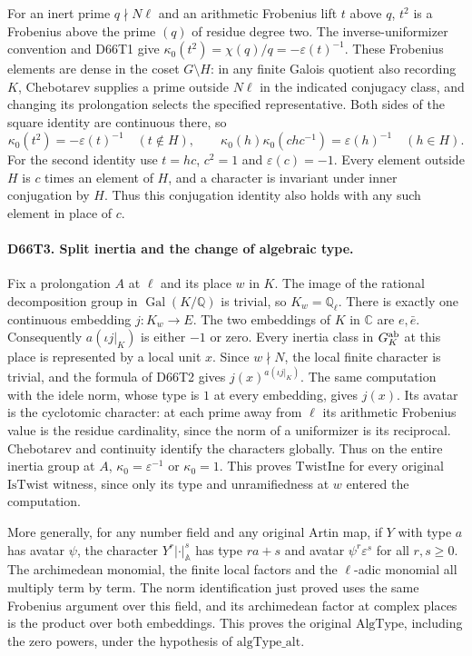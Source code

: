 For an inert prime $q\nmid N\ell$ and an arithmetic Frobenius lift
$t$ above $q$, $t^2$ is a Frobenius above the prime $(q)$ of residue
degree two. The inverse-uniformizer convention and D66T1 give
$\kappa_0(t^2)=\chi(q)/q=-\varepsilon(t)^{-1}$. These Frobenius
elements are dense in the coset $G\setminus H$: in any finite Galois
quotient also recording $K$, Chebotarev supplies a prime outside
$N\ell$ in the indicated conjugacy class, and changing its prolongation
selects the specified representative. Both sides of the square
identity are continuous there, so
\[
 \kappa_0(t^2)=-\varepsilon(t)^{-1}\quad(t\notin H),\qquad
 \kappa_0(h)\kappa_0(chc^{-1})=\varepsilon(h)^{-1}\quad(h\in H).
\]
For the second identity use $t=hc$, $c^2=1$ and
$\varepsilon(c)=-1$. Every element outside $H$ is $c$ times an
element of $H$, and a character is invariant under inner conjugation
by $H$. Thus this conjugation identity also holds with any such
element in place of $c$.

\paragraph{D66T3. Split inertia and the change of algebraic type.}
Fix a prolongation $A$ at $\ell$ and its place $w$ in $K$.
The image of the rational decomposition group in
$\operatorname{Gal}(K/\mathbb Q)$ is trivial, so $K_w=\mathbb Q_\ell$.
There is exactly one continuous embedding $j:K_w\to E$.
The two embeddings of $K$ in $\mathbb C$ are $e,\bar e$.
Consequently $a(\iota j|_K)$ is either $-1$ or zero. Every inertia
class in $G_K^{\rm ab}$ at this place is represented by a local unit
$x$. Since $w\nmid N$, the local finite character is trivial,
and the formula of D66T2 gives $j(x)^{a(\iota j|_K)}$.
The same computation with the idele norm, whose type is $1$ at
every embedding, gives $j(x)$. Its avatar is the cyclotomic
character: at each prime away from $\ell$ its arithmetic Frobenius
value is the residue cardinality, since the norm of a uniformizer
is its reciprocal. Chebotarev and continuity identify the
characters globally. Thus on the entire inertia group at $A$,
$\kappa_0=\varepsilon^{-1}$ or $\kappa_0=1$. This proves
$\mathrm{TwistIne}$ for every original $\mathrm{IsTwist}$ witness,
since only its type and unramifiedness at $w$ entered the computation.

More generally, for any number field and any original Artin map,
if $Y$ with type $a$ has avatar $\psi$, the character
$Y^r |\cdot|_{\mathbb A}^{s}$ has type $r a+s$ and avatar
$\psi^r\varepsilon^s$ for all $r,s\ge0$. The archimedean
monomial, the finite local factors and the $\ell$-adic monomial
all multiply term by term. The norm identification just proved
uses the same Frobenius argument over this field, and its
archimedean factor at complex places is the product over both
embeddings. This proves the original $\mathrm{AlgType}$, including
the zero powers, under the hypothesis of $\mathrm{algType\_alt}$.

